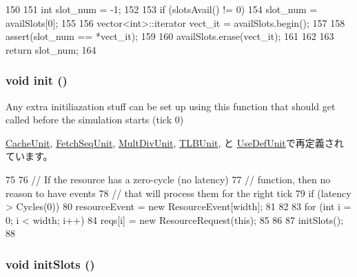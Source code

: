 \begin{DoxyCode}
150 {
151     int slot_num = -1;
152 
153     if (slotsAvail() != 0) {
154         slot_num = availSlots[0];
155 
156         vector<int>::iterator vect_it = availSlots.begin();
157 
158         assert(slot_num == *vect_it);
159 
160         availSlots.erase(vect_it);
161     }
162 
163     return slot_num;
164 }
\end{DoxyCode}
\hypertarget{classResource_a02fd73d861ef2e4aabb38c0c9ff82947}{
\subsubsection[{init}]{\setlength{\rightskip}{0pt plus 5cm}void init ()}}
\label{classResource_a02fd73d861ef2e4aabb38c0c9ff82947}
Any extra initiliazation stuff can be set up using this function that should get called before the simulation starts (tick 0) 

\hyperlink{classCacheUnit_a02fd73d861ef2e4aabb38c0c9ff82947}{CacheUnit}, \hyperlink{classFetchSeqUnit_a02fd73d861ef2e4aabb38c0c9ff82947}{FetchSeqUnit}, \hyperlink{classMultDivUnit_a02fd73d861ef2e4aabb38c0c9ff82947}{MultDivUnit}, \hyperlink{classTLBUnit_a02fd73d861ef2e4aabb38c0c9ff82947}{TLBUnit}, と \hyperlink{classUseDefUnit_a02fd73d861ef2e4aabb38c0c9ff82947}{UseDefUnit}で再定義されています。


\begin{DoxyCode}
75 {
76     // If the resource has a zero-cycle (no latency)
77     // function, then no reason to have events
78     // that will process them for the right tick
79     if (latency > Cycles(0))
80       resourceEvent = new ResourceEvent[width];
81 
82 
83     for (int i = 0; i < width; i++)
84       reqs[i] = new ResourceRequest(this);
85 
86 
87     initSlots();
88 }
\end{DoxyCode}
\hypertarget{classResource_aef17f15baa657a3b0b17d6a2c855fb02}{
\subsubsection[{initSlots}]{\setlength{\rightskip}{0pt plus 5cm}void initSlots ()}}
\label{classResource_aef17f15baa657a3b0b17d6a2c855fb02}



